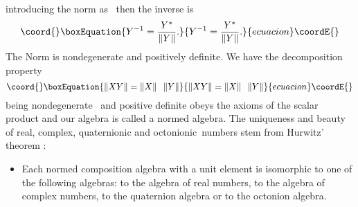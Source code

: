 \documentclass[a4paper,12pt]{book}
\begin{document}
introducing the norm as \coordHE{} \ then the inverse is 
\begin{equation}\coord{}\boxEquation{
Y^{-1}=\frac{Y^{*}}{\left\| Y\right\| }.
}{
Y^{-1}=\frac{Y^{*}}{\left\| Y\right\| }.
}{ecuacion}\coordE{}\end{equation}
The Norm is nondegenerate and positively definite. We have the decomposition
property 
\begin{equation}\coord{}\boxEquation{
\left\| XY\right\| =\left\| X\right\| \;\;\left\| Y\right\|  \label{dec}
}{
\left\| XY\right\| =\left\| X\right\| \;\;\left\| Y\right\|  }{ecuacion}\coordE{}\end{equation}
\coordHE{} being nondegenerate \ and positive definite obeys the
axioms of the scalar product and our algebra is called a normed algebra. The
uniqueness and beauty of real, complex, quaternionic and octonionic\ numbers
stem from Hurwitz' theorem \cite{hur}:

\begin{itemize}
\item[ ]  Each normed composition algebra with a unit element is isomorphic
to one of the following algebras: to the algebra of real numbers, to the
algebra of complex numbers, to the quaternion algebra or to the octonion
algebra.
\end{itemize}
\end{document}
